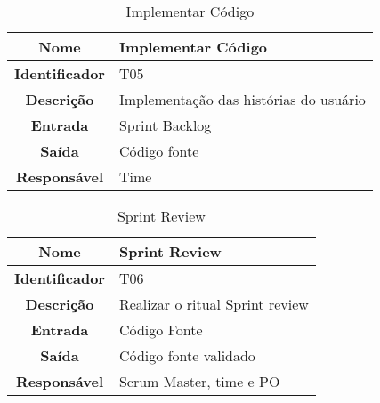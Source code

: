 {             \begin{table}[H]
                \centering
                \caption{Implementar Código}
                \begin{tabular}{c|p{10cm}}
                    \hline
                    \textbf{Nome}            & Implementar Código\\
                    \hline
                    \textbf{Identificador} & T05\\
                    \hline
                    \textbf{Descrição}   & Implementação das histórias do usuário\\
                    \hline
                    \textbf{Entrada}           & Sprint Backlog\\
                    \hline
                    \textbf{Saída}            &  Código fonte\\
                    \hline
                    \textbf{Responsável}            & Time\\
                    \hline
                \end{tabular}
            \end{table}

             \begin{table}[H]
                \centering
                \caption{Sprint Review}
                \begin{tabular}{c|p{10cm}}
                    \hline
                    \textbf{Nome}            & Sprint Review\\
                    \hline
                    \textbf{Identificador} & T06\\
                    \hline
                    \textbf{Descrição}   & Realizar o ritual Sprint review\\
                    \hline
                    \textbf{Entrada}           & Código Fonte\\
                    \hline
                    \textbf{Saída}            &  Código fonte validado\\
                    \hline
                    \textbf{Responsável}            & Scrum Master, time e PO\\
                    \hline
                \end{tabular}
            \end{table}

}
